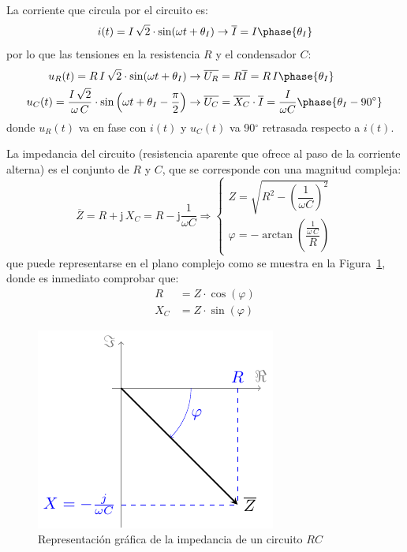 La corriente que circula por el circuito es:
\begin{equation*}
  i(t)=I\,\sqrt{2}\cdot\sin(\omega t+\theta_I)\rightarrow\overline{I}=I\phase{\theta_I}
\end{equation*}
por lo que las tensiones en la resistencia $R$ y el condensador $C$:
\begin{align*}
  u_R(t)=R\, I\,\sqrt{2}\cdot\sin(\omega t+\theta_I)&\rightarrow \overline{U_R} = R \overline{I}=R\,I\phase{\theta_I}\\ 
  u_C(t)=\dfrac{I\,\sqrt{2}}{\omega\,C} \cdot \sin \left(\omega t+\theta_I-\frac{\pi}{2}\right)&\rightarrow \overline{U_C}=\overline{X_C}\cdot\overline{I}=\dfrac{I}{\omega C}\phase{\theta_I-90^\circ}
\end{align*}
donde $u_R(t)$ va en fase con $i(t)$ y $u_C(t)$ va 90$^\circ$
retrasada respecto a $i(t)$.
	
La impedancia del circuito (resistencia aparente que ofrece al paso de
la corriente alterna) es el conjunto de $R$ y $C$, que se corresponde
con una magnitud compleja:
\begin{equation}
  \boxed{ \overline{Z} = R + \mathrm{j}\,X_C = R- \mathrm{j}\dfrac{1}{\omega C} \Rightarrow 
    \begin{cases}
      Z=\sqrt{R^2-\left(\dfrac{1}{\omega C} \right)^2}\\
      \varphi=-\arctan\left(\dfrac{\frac{1}{\omega\,C}}{R} \right)
    \end{cases}}
\end{equation}
que puede representarse en el plano complejo como se muestra en la
Figura~\ref{fig:fasorcondensadorreal}, donde es inmediato comprobar
que:
\begin{align*}
  R&=Z\cdot\cos(\varphi)\\
  X_C&=Z\cdot\sin(\varphi)
\end{align*} 
\begin{figure}[H]
  \centering \includegraphics{../figs/fasorCondensadorReal.pdf}
  \caption{Representación gráfica de la impedancia de un circuito
    $RC$}
  \label{fig:fasorcondensadorreal}
\end{figure}
	

